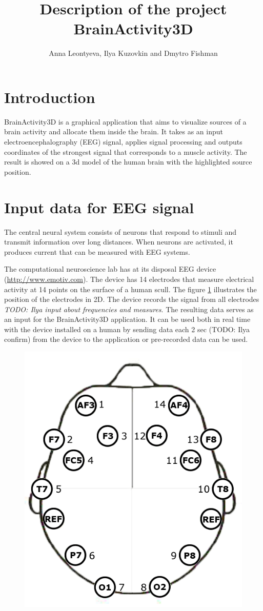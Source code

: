 \documentclass[]{article}   %
\title{Description of the project BrainActivity3D}   %
\author{Anna Leontyeva, Ilya Kuzovkin and Dmytro Fishman}
\affil{University of Tartu, Institute of Computer Science}
\begin{document}

\maketitle
     
\section{Introduction}
BrainActivity3D is a graphical application that aims to visualize sources of a brain activity and allocate them inside the brain. It takes as an input electroencephalography (EEG) signal, applies signal processing and outputs coordinates of the strongest signal that corresponds to a muscle activity. The result is showed on a 3d model of the human brain with the highlighted source position.         

\section{Input data for EEG signal}
The central neural system consists of neurons that respond to stimuli and transmit information over long distances. When  neurons are activated, it produces current that can be measured with EEG systems.
 
The computational neuroscience lab has at its disposal EEG device (\url{http://www.emotiv.com}). The device has 14 electrodes that measure electrical activity at 14 points on the surface of a human scull. The figure \ref{fig:epoc_placement} illustrates the position of the electrodes in 2D. 
The device records the signal from all electrodes  \emph{TODO: Ilya input about frequencies and measures}.
The resulting data serves as an input for the BrainActivity3D application. It can be used both in real time with the device installed on a human by sending data each 2 sec (TODO: Ilya confirm) from the device to the application or pre-recorded data can be used.
  
\begin{figure}[!h]
\begin{center}
\includegraphics[width=0.5\columnwidth]{../Images/epoc_placement} 
\caption{}
\label{fig:epoc_placement}
\end{center}
\end{figure}
 
\end{document}
